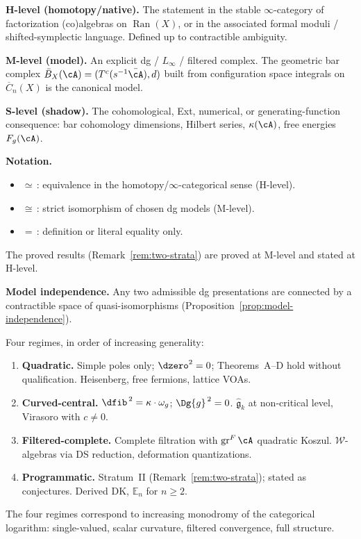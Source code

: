 \begin{convention}
\label{conv:hms-levels}

\smallskip\noindent\textbf{H-level (homotopy/native).}
The statement in the stable $\infty$-category of factorization
(co)algebras on $\operatorname{Ran}(X)$, or in the associated
formal moduli / shifted-symplectic language.  Defined up to
contractible ambiguity.

\smallskip\noindent\textbf{M-level (model).}
An explicit dg / $L_\infty$ / filtered complex.  The geometric
bar complex $\bar{B}_X(\cA) = (T^c(s^{-1}\bar{\cA}), d)$ built
from configuration space integrals on $\overline{C}_n(X)$ is the
canonical model.

\smallskip\noindent\textbf{S-level (shadow).}
The cohomological, Ext, numerical, or generating-function
consequence: bar cohomology dimensions, Hilbert series,
$\kappa(\cA)$, free energies $F_g(\cA)$.

\smallskip\noindent\textbf{Notation.}
\begin{itemize}
\item $\simeq$\,: equivalence in the homotopy/$\infty$-categorical
  sense (H-level).
\item $\cong$\,: strict isomorphism of chosen dg models (M-level).
\item $=$\,: definition or literal equality only.
\end{itemize}
The proved results (Remark~\ref{rem:two-strata}) are proved at
M-level and stated at H-level.

\smallskip\noindent\textbf{Model independence.}
Any two admissible dg presentations are connected by a contractible
space of quasi-isomorphisms
(Proposition~\ref{prop:model-independence}).
\end{convention}

\begin{convention}\label{conv:regime-tags}\label{conv:proof-architecture}
Four regimes, in order of increasing generality:
\begin{enumerate}
\item \textbf{Quadratic.}  Simple poles only; $\dzero^2 = 0$;
  Theorems~A--D hold without qualification.
  Heisenberg, free fermions, lattice VOAs.
\item \textbf{Curved-central.}
  $\dfib^{\,2} = \kappa \cdot \omega_g$; $\Dg{g}^{\,2} = 0$.
  $\widehat{\mathfrak{g}}_k$ at non-critical level, Virasoro
  with $c \neq 0$.
\item \textbf{Filtered-complete.}  Complete filtration with
  $\operatorname{gr}^F \cA$ quadratic Koszul.
  $\mathcal{W}$-algebras via DS reduction, deformation
  quantizations.
\item \textbf{Programmatic.}  Stratum~II
  (Remark~\ref{rem:two-strata}); stated as conjectures.
  Derived DK, $\mathbb{E}_n$ for $n \geq 2$.
\end{enumerate}
The four regimes correspond to increasing monodromy of the
categorical logarithm: single-valued, scalar curvature, filtered
convergence, full structure.
\end{convention}


